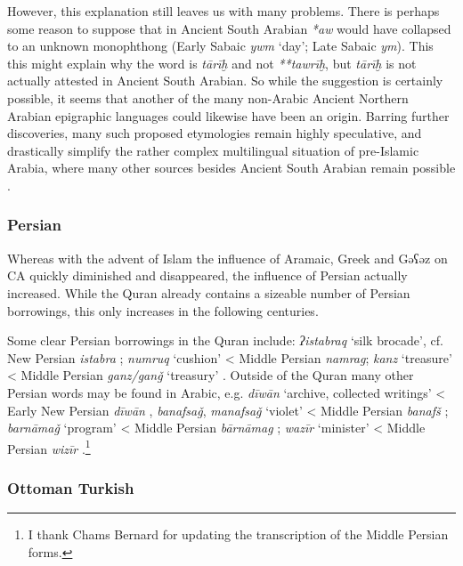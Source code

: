 \documentclass[output=paper]{langsci/langscibook}
\begin{document}
However, this explanation still leaves us with many problems. There is perhaps some reason to suppose that in Ancient South Arabian \textit{*aw} would have collapsed to an unknown monophthong (Early Sabaic \textit{ywm} ‘day’; Late Sabaic \textit{ym}). This this might explain why the word is \textit{tārīḫ} and not \textit{**tawrīḫ}, but \textit{tārīḫ} is not actually attested in Ancient South Arabian. So while the suggestion is certainly possible, it seems that another of the many non-Arabic Ancient Northern Arabian epigraphic languages could likewise have been an origin. Barring further discoveries, many such proposed etymologies remain highly speculative, and drastically simplify the rather complex multilingual situation of pre-Islamic Arabia, where many other sources besides Ancient South Arabian remain possible \citep{Al-Jallad2018ANA}.

\subsubsection{\label{bkm:Ref13224492}Persian}

Whereas with the advent of Islam the influence of Aramaic, Greek and Gəʕəz on CA quickly diminished and disappeared, the influence of Persian actually increased. While the Quran already contains a sizeable number of Persian borrowings, this only increases in the following centuries.

Some clear Persian borrowings in the Quran include: \textit{ʔistabraq} `silk brocade', cf. New Persian \textit{istabra} \citep[204]{Eilers1962}; \textit{numruq} `cushion' < Middle Persian \textit{namrag}; \textit{kanz} ‘treasure’ < Middle Persian \textit{ganz/ganǧ} ‘treasury’ \citep[206]{Eilers1962}. Outside of the Quran many other Persian words may be found in Arabic, e.g. \textit{dīwān} ‘archive, collected writings’ < Early New Persian \textit{dīwān} \citep[223]{Eilers1962}, \textit{banafsaǧ}, \textit{manafsaǧ} ‘violet’ < Middle Persian \textit{banafš} \citep[596]{Eilers1971}; \textit{barnāmaǧ} ‘program’ < Middle Persian \textit{bārnāmag} \citep[217-218]{Eilers1962}; \textit{wazīr} ‘minister’ < Middle Persian \textit{wizīr} \citep[207]{Eilers1962}.\footnote{I thank Chams Bernard for updating the transcription of the Middle Persian forms.}

\subsubsection{\label{bkm:Ref13483797}Ottoman Turkish}
\end{document}
